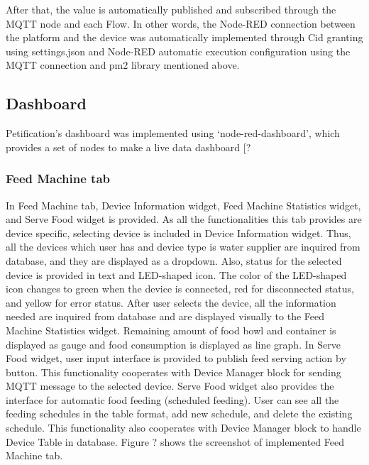 \documentclass[conference]{IEEEtran}
\begin{document}
After that, the value is automatically published and subscribed through the MQTT node and each Flow.
In other words, the Node-RED connection between the platform and the device was automatically implemented through Cid granting using settings.json and Node-RED automatic execution configuration using the MQTT connection and pm2 library mentioned above.

\subsection{Dashboard}
Petification’s dashboard was implemented using ‘node-red-dashboard’, which provides a set of nodes to make a live data dashboard [?

\subsubsection{Feed Machine tab}
In Feed Machine tab, Device Information widget, Feed Machine Statistics widget, and Serve Food widget is provided. As all the functionalities this tab provides are device specific, selecting device is included in Device Information widget. Thus, all the devices which user has and device type is water supplier are inquired from database, and they are displayed as a dropdown. Also, status for the selected device is provided in text and LED-shaped icon. The color of the LED-shaped icon changes to green when the device is connected, red for disconnected status, and yellow for error status. After user selects the device, all the information needed are inquired from database and are displayed visually to the Feed Machine Statistics widget. Remaining amount of food bowl and container is displayed as gauge and food consumption is displayed as line graph. In Serve Food widget, user input interface is provided to publish feed serving action by button. This functionality cooperates with Device Manager block for sending MQTT message to the selected device. Serve Food widget also provides the interface for automatic food feeding (scheduled feeding). User can see all the feeding schedules in the table format, add new schedule, and delete the existing schedule. This functionality also cooperates with Device Manager block to handle Device Table in database. Figure ?
shows the screenshot of implemented Feed Machine tab.
\end{document}
